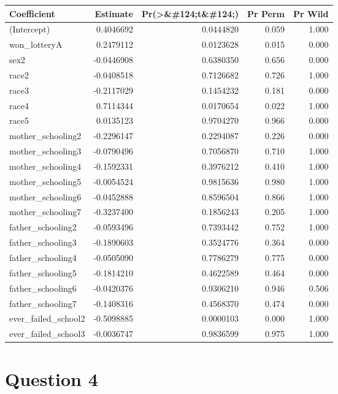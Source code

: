 \documentclass[
]{article}
\begin{document}
\begin{longtable}[t]{lrrrr}
\toprule
Coefficient & Estimate & Pr(>\&\#124;t\&\#124;) & Pr Perm & Pr Wild\\
\midrule\relax
(Intercept) & 0.4046692 & 0.0444820 & 0.059 & 1.000\\
won\_lotteryA & 0.2479112 & 0.0123628 & 0.015 & 0.000\\
sex2 & -0.0446908 & 0.6380350 & 0.656 & 0.000\\
race2 & -0.0408518 & 0.7126682 & 0.726 & 1.000\\
race3 & -0.2117029 & 0.1454232 & 0.181 & 0.000\\
\addlinespace
race4 & 0.7114344 & 0.0170654 & 0.022 & 1.000\\
race5 & 0.0135123 & 0.9704270 & 0.966 & 0.000\\
mother\_schooling2 & -0.2296147 & 0.2294087 & 0.226 & 0.000\\
mother\_schooling3 & -0.0790496 & 0.7056870 & 0.710 & 1.000\\
mother\_schooling4 & -0.1592331 & 0.3976212 & 0.410 & 1.000\\
\addlinespace
mother\_schooling5 & -0.0054524 & 0.9815636 & 0.980 & 1.000\\
mother\_schooling6 & -0.0452888 & 0.8596504 & 0.866 & 1.000\\
mother\_schooling7 & -0.3237400 & 0.1856243 & 0.205 & 1.000\\
father\_schooling2 & -0.0593496 & 0.7393442 & 0.752 & 1.000\\
father\_schooling3 & -0.1890603 & 0.3524776 & 0.364 & 0.000\\
\addlinespace
father\_schooling4 & -0.0505090 & 0.7786279 & 0.775 & 0.000\\
father\_schooling5 & -0.1814210 & 0.4622589 & 0.464 & 0.000\\
father\_schooling6 & -0.0420376 & 0.9306210 & 0.946 & 0.506\\
father\_schooling7 & -0.1408316 & 0.4568370 & 0.474 & 0.000\\
ever\_failed\_school2 & -0.5098885 & 0.0000103 & 0.000 & 1.000\\
\addlinespace
ever\_failed\_school3 & -0.0036747 & 0.9836599 & 0.975 & 1.000\\
\bottomrule
\end{longtable}

\section{Question 4}\label{question-4}
\end{document}

